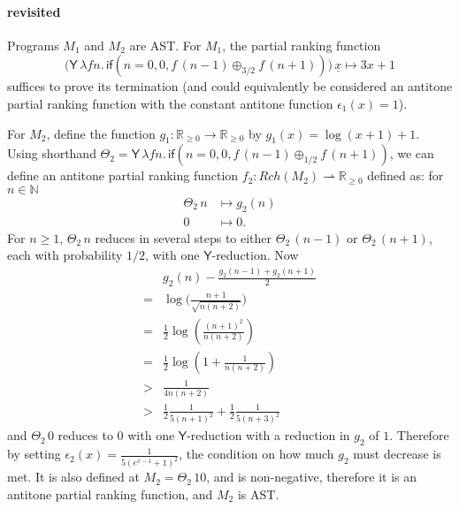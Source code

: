 \documentclass{article}
\newcommand{\nnReal}{\mathbb{R}_{{\geq}0}}
\newcommand{\tY}{\mathsf{Y}}
\newcommand{\tif}[3]{\mathsf{if}(#1, #2, #3)} %
\theoremstyle{definition}
\theoremstyle{lemma}
\theoremstyle{remark}
\begin{document}
\paragraph{ revisited}

Programs $M_1$ and $M_2$ are AST. For $M_1$, the partial ranking function 
\[
\big(\tY \, \lambda f n . \, \tif{n=0}{0}{f \, (n-1) \oplus_{3/2} f \, (n+1)}\big) \, \underline x \mapsto 3x + 1
\] 
suffices to prove its termination (and could equivalently be considered an antitone partial ranking function with the constant antitone function $\epsilon_1(x) = 1$).

For $M_2$, define the function $g_1 : \nnReal \to \nnReal$ by $g_1(x) = \log(x+1) + 1$.
Using shorthand 
$\Theta_2 = \tY \, \lambda f n . \, 
\tif{n = 0}{0}{f \, (n - 1) \oplus_{1/2} f \, (n + 1)}$, 
we can define an antitone partial ranking function $f_2 : \mathit{Rch}(M_2) \rightharpoonup \nnReal$ 
defined as: for $n \in \mathbb N$
\begin{align*}
{\Theta_2} \, n 
&\mapsto 
g_2(n)
\\
0 &\mapsto 0.
\end{align*}
For $n \geq 1$, $\Theta_2 \, n$ reduces in several steps to either $\Theta_2 \, (n-1)$ or $\Theta_2 \, (n+1)$, each with probability $1/2$, with one $\tY$-reduction.
Now
\begin{align*}
  & g_2(n) - \frac{g_2(n-1) + g_2(n+1)} 2 \\
  = & \log \Big(\frac{n+1}{\sqrt{n(n+2)}}\Big) \\
  = & \frac 1 2 \log\left(\frac{(n+1)^2}{n(n+2)}\right) \\
  = & \frac 1 2 \log\left(1 + \frac 1 {n(n+2)}\right) \\
  > & \frac 1 {4n(n+2)} \\
  > & \frac 1 2 \frac 1 {5(n+1)^2} + \frac 1 2 \frac 1 {5(n+3)^2}
\end{align*}
and $\Theta_2 \, 0$ reduces to $0$ with one $\tY$-reduction with a reduction in $g_2$ of $1$.
Therefore by setting $\epsilon_2(x) = \frac 1 {5(e^{x-1}+1)^2}$, the condition on how much $g_2$ must decrease is met. It is also defined at $M_2 = \Theta_2 \, 10$, and is non-negative, therefore it is an antitone partial ranking function, and $M_2$ is AST.
\end{document}
